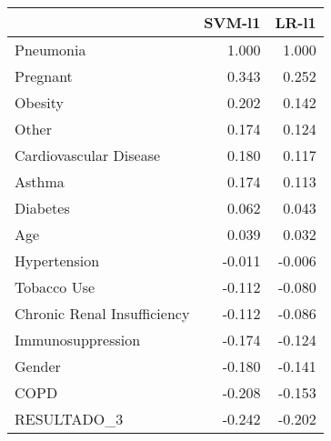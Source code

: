 \begin{tabular}{lrr}
\toprule
{} &  SVM-l1 &  LR-l1 \\
\midrule
Pneumonia                   &   1.000 &  1.000 \\
Pregnant                    &   0.343 &  0.252 \\
Obesity                     &   0.202 &  0.142 \\
Other                       &   0.174 &  0.124 \\
Cardiovascular Disease      &   0.180 &  0.117 \\
Asthma                      &   0.174 &  0.113 \\
Diabetes                    &   0.062 &  0.043 \\
Age                         &   0.039 &  0.032 \\
Hypertension                &  -0.011 & -0.006 \\
Tobacco Use                 &  -0.112 & -0.080 \\
Chronic Renal Insufficiency &  -0.112 & -0.086 \\
Immunosuppression           &  -0.174 & -0.124 \\
Gender                      &  -0.180 & -0.141 \\
COPD                        &  -0.208 & -0.153 \\
RESULTADO\_3                 &  -0.242 & -0.202 \\
\bottomrule
\end{tabular}

